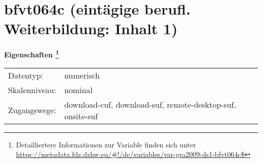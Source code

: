 
    \setcounter{footnote}{0}

    \vspace*{-1.8cm}
	\section{bfvt064c (eintägige berufl. Weiterbildung: Inhalt 1)}
	\label{section:bfvt064c}



    \vspace*{0.5cm}
    \noindent\textbf{Eigenschaften
	\footnote{Detailliertere Informationen zur Variable finden sich unter
		\url{https://metadata.fdz.dzhw.eu/\#!/de/variables/var-gra2009-ds1-bfvt064c$}}}\\
	\begin{tabularx}{\hsize}{@{}lX}
	Datentyp: & numerisch \\
	Skalenniveau: & nominal \\
	Zugangswege: &
	  download-cuf, 
	  download-suf, 
	  remote-desktop-suf, 
	  onsite-suf
 \\
    \end{tabularx}



